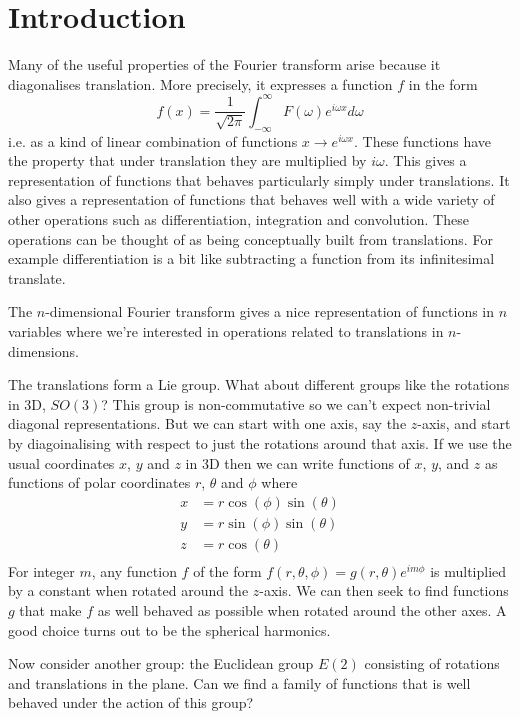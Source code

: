 \documentclass{article}
\begin{document}
\section{Introduction}
Many of the useful properties of the Fourier transform arise because it diagonalises translation.
More precisely, it expresses a function $f$ in the form
\[
f(x) = \frac{1}{\sqrt{2\pi}}\int_{-\infty}^\infty F(\omega)e^{i\omega x}d\omega
\]
i.e. as a kind of linear combination of functions $x\rightarrow e^{i\omega x}$.
These functions have the property that under translation they are multiplied by $i\omega$.
This gives a representation of functions that behaves particularly simply under translations.
It also gives a representation of functions that behaves well with a wide variety of other operations such as differentiation, integration and convolution.
These operations can be thought of as being conceptually built from translations.
For example differentiation is a bit like subtracting a function from its infinitesimal translate.

The $n$-dimensional Fourier transform gives a nice representation of functions in $n$ variables where we're interested in operations related to translations in $n$-dimensions.

The translations form a Lie group.
What about different groups like the rotations in 3D, $SO(3)$?
This group is non-commutative so we can't expect non-trivial diagonal representations.
But we can start with one axis, say the $z$-axis, and start by diagoinalising with respect to just the rotations around that axis.
If we use the usual coordinates $x$, $y$ and $z$ in 3D then we can write functions of $x$, $y$, and $z$ as functions of polar coordinates $r$, $\theta$ and $\phi$ where
\begin{align*}
x & = r\cos(\phi)\sin(\theta) \\
y & = r\sin(\phi)\sin(\theta) \\
z & = r\cos(\theta) \\
\end{align*}
For integer $m$, any function $f$ of the form $f(r,\theta,\phi) = g(r,\theta)e^{im\phi}$ is multiplied by a constant when rotated around the $z$-axis.
We can then seek to find functions $g$ that make $f$ as well behaved as possible when rotated around the other axes.
A good choice turns out to be the spherical harmonics.

Now consider another group: the Euclidean group $E(2)$ consisting of rotations and translations in the plane.
Can we find a family of functions that is well behaved under the action of this group?
\end{document}
